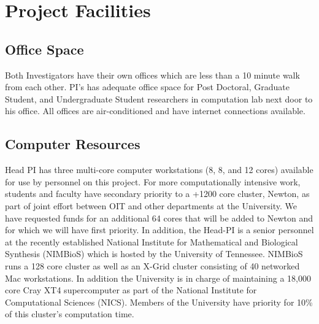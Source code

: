 \documentclass[11pt,fleqn]{article}
\begin{document}
\section*{Project Facilities}
\subsection*{Office Space}
Both Investigators have their own offices which are less than a 10 minute walk from each other.
PI's has adequate office space for Post Doctoral, Graduate Student, and Undergraduate Student researchers in computation lab next door to his office.
All offices are air-conditioned and have internet connections available.

\subsection*{Computer Resources}
Head PI has three multi-core computer workstations (8, 8, and 12 cores) available for use by personnel on this project.
For more computationally intensive work, students and faculty have secondary priority to a +1200 core cluster, Newton, as part of  joint effort between OIT and other departments at the University.
We have requested funds for an additional 64 cores that will be added to Newton and for which we will have first priority. 
In addition, the Head-PI is a senior personnel at the recently established National Institute for Mathematical and Biological Synthesis (NIMBioS) which is hosted by the University of Tennessee.
NIMBioS runs a 128 core cluster as well as an X-Grid cluster consisting of 40 networked Mac workstations.
In addition the University is in charge of maintaining a 18,000 core Cray XT4 supercomputer as part of the National Institute for Computational Sciences (NICS).
Members of the University have priority for 10\% of this cluster's computation time.
\end{document}
